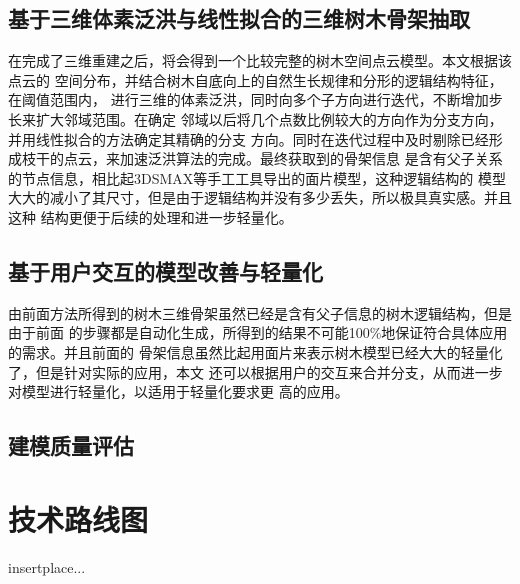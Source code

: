 \subsection{基于三维体素泛洪与线性拟合的三维树木骨架抽取}
\label{subsec:treesklextract}
在完成了三维重建之后，将会得到一个比较完整的树木空间点云模型。本文根据该点云的
空间分布，并结合树木自底向上的自然生长规律和分形的逻辑结构特征，在阈值范围内，
进行三维的体素泛洪，同时向多个子方向进行迭代，不断增加步长来扩大邻域范围。在确定
邻域以后将几个点数比例较大的方向作为分支方向，并用线性拟合的方法确定其精确的分支
方向。同时在迭代过程中及时剔除已经形成枝干的点云，来加速泛洪算法的完成。最终获取到的骨架信息
是含有父子关系的节点信息，相比起3DSMAX等手工工具导出的面片模型，这种逻辑结构的
模型大大的减小了其尺寸，但是由于逻辑结构并没有多少丢失，所以极具真实感。并且这种
结构更便于后续的处理和进一步轻量化。

\subsection{基于用户交互的模型改善与轻量化}
\label{subsec:userinteraction}
由前面方法所得到的树木三维骨架虽然已经是含有父子信息的树木逻辑结构，但是由于前面
的步骤都是自动化生成，所得到的结果不可能100\%地保证符合具体应用的需求。并且前面的
骨架信息虽然比起用面片来表示树木模型已经大大的轻量化了，但是针对实际的应用，本文
还可以根据用户的交互来合并分支，从而进一步对模型进行轻量化，以适用于轻量化要求更
高的应用。

\subsection{建模质量评估}
\label{subsec:qualityevaluation}

\section{技术路线图}
\label{sec:techrouteimg}
insertplace...
